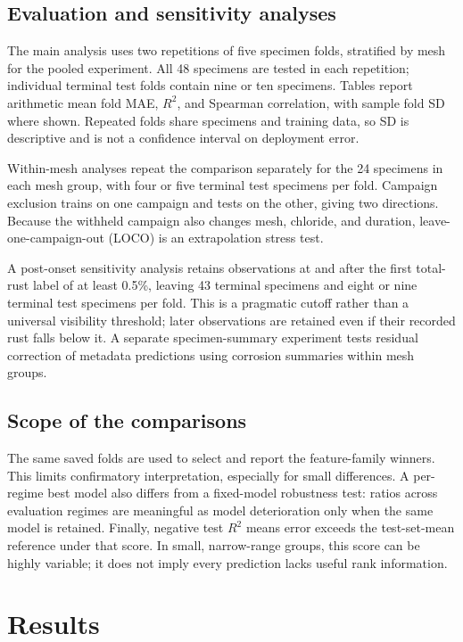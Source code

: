 \documentclass[conference]{IEEEtran}
\begin{document}
\subsection{Evaluation and sensitivity analyses}
The main analysis uses two repetitions of five specimen folds, stratified by mesh for the pooled experiment. All 48 specimens are tested in each repetition; individual terminal test folds contain nine or ten specimens. Tables report arithmetic mean fold MAE, $R^2$, and Spearman correlation, with sample fold SD where shown. Repeated folds share specimens and training data, so SD is descriptive and is not a confidence interval on deployment error.

Within-mesh analyses repeat the comparison separately for the 24 specimens in each mesh group, with four or five terminal test specimens per fold. Campaign exclusion trains on one campaign and tests on the other, giving two directions. Because the withheld campaign also changes mesh, chloride, and duration, leave-one-campaign-out (LOCO) is an extrapolation stress test.

A post-onset sensitivity analysis retains observations at and after the first total-rust label of at least 0.5\%, leaving 43 terminal specimens and eight or nine terminal test specimens per fold. This is a pragmatic cutoff rather than a universal visibility threshold; later observations are retained even if their recorded rust falls below it. A separate specimen-summary experiment tests residual correction of metadata predictions using corrosion summaries within mesh groups.

\subsection{Scope of the comparisons}
The same saved folds are used to select and report the feature-family winners. This limits confirmatory interpretation, especially for small differences. A per-regime best model also differs from a fixed-model robustness test: ratios across evaluation regimes are meaningful as model deterioration only when the same model is retained. Finally, negative test $R^2$ means error exceeds the test-set-mean reference under that score. In small, narrow-range groups, this score can be highly variable; it does not imply every prediction lacks useful rank information.

\section{Results}
\end{document}
